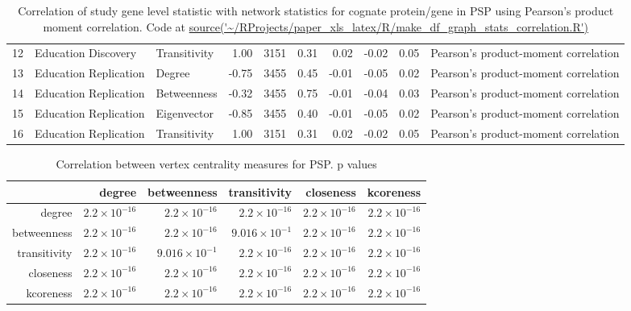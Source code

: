 \begin{table}[ht]
\begin{tabular}{rllrlrrrrl}
  12 & Education Discovery & Transitivity & 1.00 & 3151 & 0.31 & 0.02 & -0.02 & 0.05 & Pearson's product-moment correlation \\ 
  13 & Education Replication & Degree & -0.75 & 3455 & 0.45 & -0.01 & -0.05 & 0.02 & Pearson's product-moment correlation \\ 
  14 & Education Replication & Betweenness & -0.32 & 3455 & 0.75 & -0.01 & -0.04 & 0.03 & Pearson's product-moment correlation \\ 
  15 & Education Replication & Eigenvector & -0.85 & 3455 & 0.40 & -0.01 & -0.05 & 0.02 & Pearson's product-moment correlation \\ 
  16 & Education Replication & Transitivity & 1.00 & 3151 & 0.31 & 0.02 & -0.02 & 0.05 & Pearson's product-moment correlation \\ 
   \hline
\end{tabular}
\caption{Correlation of study gene level statistic with network statistics for cognate protein/gene in PSP using Pearson's product moment correlation. Code at \url{source('~/RProjects/paper_xls_latex/R/make_df_graph_stats_correlation.R')}}
\end{table}

\begin{table}[ht]
\centering
\begin{tabular}{rrrrrr}
  \hline
 & degree & betweenness & transitivity & closeness & kcoreness \\ 
  \hline
degree & $2.2 \times 10^{-16}$ & $2.2 \times 10^{-16}$ & $2.2 \times 10^{-16}$ & $2.2 \times 10^{-16}$ & $2.2 \times 10^{-16}$ \\ 
  betweenness & $2.2 \times 10^{-16}$ & $2.2 \times 10^{-16}$ & $9.016 \times 10^{-1}$ & $2.2 \times 10^{-16}$ & $2.2 \times 10^{-16}$ \\ 
  transitivity & $2.2 \times 10^{-16}$ & $9.016 \times 10^{-1}$ & $2.2 \times 10^{-16}$ & $2.2 \times 10^{-16}$ & $2.2 \times 10^{-16}$ \\ 
  closeness & $2.2 \times 10^{-16}$ & $2.2 \times 10^{-16}$ & $2.2 \times 10^{-16}$ & $2.2 \times 10^{-16}$ & $2.2 \times 10^{-16}$ \\ 
  kcoreness & $2.2 \times 10^{-16}$ & $2.2 \times 10^{-16}$ & $2.2 \times 10^{-16}$ & $2.2 \times 10^{-16}$ & $2.2 \times 10^{-16}$ \\ 
   \hline
\end{tabular}
\caption{Correlation between vertex centrality measures for PSP. p values} 
\label{tab:Correlation between vertex centrality measures for PSP. p values}
\end{table}

